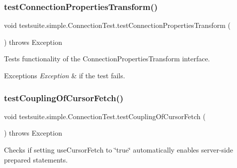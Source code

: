 \subsubsection{\texorpdfstring{test\+Connection\+Properties\+Transform()}{testConnectionPropertiesTransform()}}
{\footnotesize\ttfamily void testsuite.\+simple.\+Connection\+Test.\+test\+Connection\+Properties\+Transform (\begin{DoxyParamCaption}{ }\end{DoxyParamCaption}) throws Exception}

Tests functionality of the Connection\+Properties\+Transform interface.


\begin{DoxyExceptions}{Exceptions}
{\em Exception} & if the test fails. \\
\hline
\end{DoxyExceptions}
\mbox{\label{classtestsuite_1_1simple_1_1_connection_test_a64a129c95efd45055e9abf405d3eb5b1}} 
\subsubsection{\texorpdfstring{test\+Coupling\+Of\+Cursor\+Fetch()}{testCouplingOfCursorFetch()}}
{\footnotesize\ttfamily void testsuite.\+simple.\+Connection\+Test.\+test\+Coupling\+Of\+Cursor\+Fetch (\begin{DoxyParamCaption}{ }\end{DoxyParamCaption}) throws Exception}

Checks if setting use\+Cursor\+Fetch to \char`\"{}true\char`\"{} automatically enables server-\/side prepared statements. \mbox{\label{classtestsuite_1_1simple_1_1_connection_test_a0293a623600d8ff3ca51a6830f46dea2}} 
